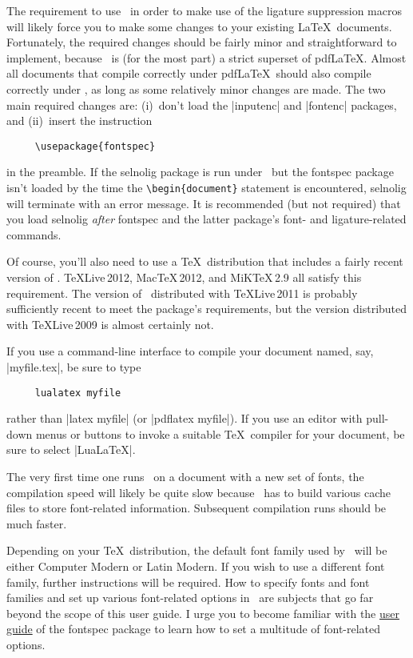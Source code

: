 \documentclass[12pt]{article}
\newcommand{\pkg}[1]{\textsf{#1}}
\begin{document}
The requirement to use \LuaLaTeX\ in order to make use of the ligature suppression macros will likely force you to make some changes to your existing \LaTeX\ documents. Fortunately, the required changes should be fairly minor and straightforward to implement, because \LuaLaTeX\ is (for the most part) a strict superset of pdf\LaTeX. Almost all documents that compile correctly under pdf\LaTeX\ should also compile correctly under \LuaLaTeX, as long as some relatively minor changes are made.
The two main required changes are: (i)~don't load the |inputenc| and |fontenc| packages, and (ii)~insert the instruction
\begin{Verbatim}
     \usepackage{fontspec}
\end{Verbatim}
in the preamble. If the \pkg{selnolig} package is run under \LuaLaTeX\ but the \pkg{fontspec} package isn't loaded by the time the \Verb+\begin{document}+ statement is encountered, \pkg{selnolig} will terminate with an error message. It is recommended (but not required) that you load \pkg{selnolig} \emph{after} \pkg{fontspec} and the latter package's font- and ligature-related commands.

Of course, you'll also need to use a \TeX\ distribution that includes a fairly recent version of \LuaLaTeX. \TeX Live\,2012, Mac\TeX\,2012, and MiK\TeX\,2.9 all satisfy this requirement. The version of \LuaLaTeX\ distributed with TeXLive\,2011 is probably sufficiently recent to meet the package's requirements, but the version distributed with TeXLive\,2009 is almost certainly not. 

If you use a command-line interface to compile your document named, say, |myfile.tex|, be sure to type 
\begin{Verbatim}
     lualatex myfile
\end{Verbatim}
rather than |latex myfile| (or |pdflatex myfile|). If you use an editor with pull-down menus or buttons to invoke a suitable \TeX\ compiler for your document, be sure to select |LuaLaTeX|. 

The very first time one runs \LuaLaTeX\ on a document with a new set of fonts, the compilation speed will likely be quite slow because \LuaLaTeX\ has to build various cache files to store font-related information. Subsequent compilation runs should be much faster. 

Depending on your \TeX\ distribution, the default font family used by \LuaLaTeX\ will be either Computer Modern or Latin Modern. If you wish to use a different font family, further instructions will be required. How to specify fonts and font families and set up various font-related options in \LuaLaTeX\ are subjects that go far beyond the scope of this user guide. I urge you to become familiar with the \href{http://www.ctan.org/tex-archive/macros/latex/contrib/fontspec/fontspec.pdf}{user guide} of the \pkg{fontspec} package to learn how to set a multitude of font-related options.


\end{document}
\end{document}
